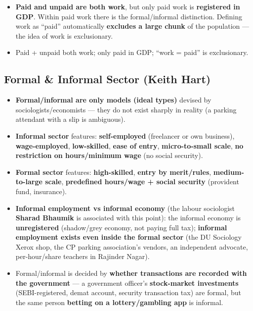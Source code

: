 \begin{KeyConcept}
\begin{itemize}
    \item \textbf{Paid and unpaid are both work}, but only paid work is \textbf{registered in GDP}. Within paid work there is the formal/informal distinction. Defining work as ``paid'' automatically \textbf{excludes a large chunk} of the population --- the idea of work is exclusionary.
\end{itemize}
\end{KeyConcept}

\begin{QuickRevision}
\begin{itemize}
    \item Paid + unpaid both work; only paid in GDP; ``work = paid'' is exclusionary.
\end{itemize}
\end{QuickRevision}

\sectiondivider

\subsection{Formal \& Informal Sector (Keith Hart)}

\begin{KeyConcept}
\begin{itemize}
    \item \textbf{Formal/informal are only models (ideal types)} devised by sociologists/economists --- they do not exist sharply in reality (a parking attendant with a slip is ambiguous).
    \item \textbf{Informal sector} features: \textbf{self-employed} (freelancer or own business), \textbf{wage-employed}, \textbf{low-skilled}, \textbf{ease of entry}, \textbf{micro-to-small scale}, \textbf{no restriction on hours/minimum wage} (no social security).
    \item \textbf{Formal sector} features: \textbf{high-skilled}, \textbf{entry by merit/rules}, \textbf{medium-to-large scale}, \textbf{predefined hours/wage + social security} (provident fund, insurance).
    \item \textbf{Informal employment vs informal economy} (the labour sociologist \textbf{Sharad Bhaumik} is associated with this point): the informal economy is \textbf{unregistered} (shadow/grey economy, not paying full tax); \textbf{informal employment exists even inside the formal sector} (the DU Sociology Xerox shop, the CP parking association's vendors, an independent advocate, per-hour/share teachers in Rajinder Nagar).
    \item Formal/informal is decided by \textbf{whether transactions are recorded with the government} --- a government officer's \textbf{stock-market investments} (SEBI-registered, demat account, security transaction tax) are formal, but the same person \textbf{betting on a lottery/gambling app} is informal.
\end{itemize}
\end{KeyConcept}

